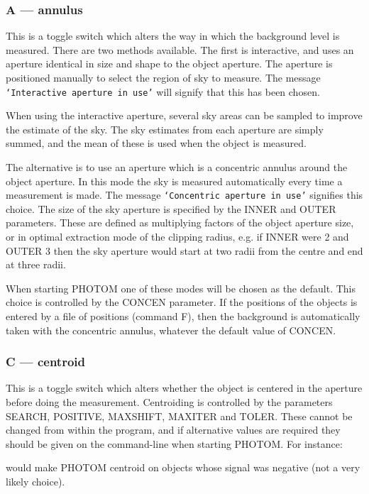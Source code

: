 \documentclass[twoside,11pt,nolof]{starlink}
\providecommand{\st}[1]{\texttt{`#1'}}
\begin{document}
\subsubsection{A --- annulus}

This is a toggle switch which alters the way in which the background
level is measured. There are two methods available. The first is
interactive, and uses an aperture identical in size and shape to the
object aperture. The aperture is positioned manually to select the
region of sky to measure. The message \st{Interactive aperture in use}
will signify that this has been chosen.

When using the interactive aperture, several sky areas can be sampled
to improve the estimate of the sky. The sky estimates from each
aperture are simply summed, and the mean of these is used when the
object is measured.

The alternative is to use an aperture which is a concentric annulus
around the object aperture. In this mode the sky is measured
automatically every time a measurement is made. The message
\st{Concentric aperture in use} signifies this choice. The size of the
sky aperture is specified by the INNER and OUTER parameters. These are
defined as multiplying factors of the object aperture size, or in optimal
extraction mode of the clipping radius, e.g. if INNER were 2 and OUTER 3
then the sky aperture would start at two radii from the centre and end at
three radii.

When starting PHOTOM one of these modes will be chosen as the default.
This choice is controlled by the CONCEN parameter.
If the positions of the objects is entered by a file of positions
(command F), then the background is automatically taken with the
concentric annulus, whatever the default value of CONCEN.

\subsubsection{C --- centroid}

This is a toggle switch which alters whether the object is centered in
the aperture before doing the measurement. Centroiding is
controlled by the parameters SEARCH, POSITIVE, MAXSHIFT, MAXITER and
TOLER. These cannot be changed from within the program, and if
alternative values are required they should be given on the
command-line when starting PHOTOM. For instance:
\begin{terminalv}
\end{terminalv}
would make PHOTOM centroid on objects whose signal was negative (not a
very likely choice).
\end{document}
